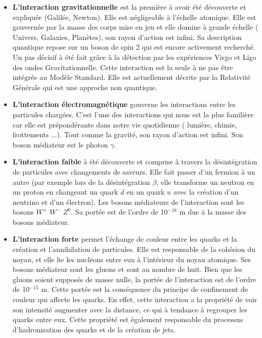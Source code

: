 \begin{itemize}[label=$\bullet$]
\item \textbf{L'interaction gravitationnelle} est la première à avoir été découverte et expliquée (Galilée, Newton). Elle est négligeable à l'échelle atomique. Elle est gouvernée par la masse des corps mise en jeu et elle domine à grande échelle ( Univers, Galaxies, Planètes), son rayon d'action est infini. Sa description quantique repose sur un boson de spin 2 qui est encore activement recherché. Un pas décisif à été fait grâce à la détection par les expériences Virgo et Ligo des ondes Gravitationnelle. Cette interaction est la seule à ne pas être intégrée au Modèle Standard. Elle est actuellement décrite par la Relativité Générale qui est une approche non quantique.

\item \textbf{L'interaction électromagnétique} gouverne les interactions entre les particules chargées. C'est l'une des interactions qui nous est la plus familière car elle est prépondérante dans notre vie quotidienne ( lumière, chimie, frottements ...). Tout comme la gravité, son rayon d'action est infini. Son boson médiateur est le photon $\gamma$.

\item \textbf{L'interaction faible} à été découverte et comprise à travers la désintégration de particules avec changements de saveurs. Elle fait passer d'un fermion à un autre (par exemple lors de la désintégration $\beta$, elle transforme un neutron en un proton en changeant un quark $d$ en un quark $u$ avec la création d'un neutrino et d'un électron). Les bosons médiateurs de l'interaction sont les bosons $W^{+}$ $W^{-}$ $Z^{0}$. Sa portée est de l'ordre de 10$^{-18}$ m due à la masse des bosons médiateur.

\item \textbf{L'interaction forte} permet l'échange de couleur entre les quarks et la création et l'annihilation de particules. Elle est responsable de la cohésion du noyau, et elle lie les nucléons entre eux à l'intérieur du noyau atomique. Ses bosons médiateur sont les gluons et sont au nombre de huit. Bien que les gluons soient supposés de masse nulle, la portée de l'interaction est de l'ordre de 10$^{-15}$ m. Cette portée est la conséquence du principe de confinement de couleur qui affecte les quarks. En effet, cette interaction a la propriété de voir son intensité augmenter avec la distance, ce qui à tendance à regrouper les quarks entre eux. Cette propriété est également responsable du processus d'hadronisation des quarks et de la création de jets.
\end{itemize}

